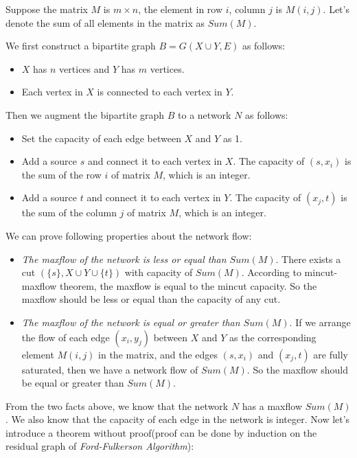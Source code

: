 
Suppose the matrix $M$ is $m \times n$, the element in row $i$, column $j$ is $M(i, j)$. Let's denote the sum of all elements in the matrix as $Sum(M)$.

We first construct a bipartite graph $B = G(X \cup Y, E)$ as follows:

\begin{itemize}
  \item $X$ has $n$ vertices and $Y$ has $m$ vertices.
  \item Each vertex in $X$ is connected to each vertex in $Y$.
\end{itemize}

Then we augment the bipartite graph $B$ to a network $N$ as follows:

\begin{itemize}
  \item Set the capacity of each edge between $X$ and $Y$ as 1.
  \item Add a source $s$ and connect it to each vertex in $X$. The capacity of $(s, x_i)$ is the sum of the row $i$ of matrix $M$, which is an integer.
  \item Add a source $t$ and connect it to each vertex in $Y$. The capacity of $(x_j, t)$ is the sum of the column $j$ of matrix $M$, which is an integer.
\end{itemize}

We can prove following properties about the network flow:

\begin{itemize}
  \item \textit{The maxflow of the network is less or equal than $Sum(M)$}. There exists a cut $(\{s\}, X \cup Y \cup \{t\})$ with capacity of $Sum(M)$. According to mincut-maxflow theorem, the maxflow is equal to the mincut capacity. So the maxflow should be less or equal than the capacity of any cut.
  \item \textit{The maxflow of the network is equal or greater than $Sum(M)$}. If we arrange the flow of each edge $(x_i, y_j)$ between $X$ and $Y$ as the corresponding element $M(i, j)$ in the matrix, and the edges $(s, x_i)$ and $(x_j, t)$ are fully saturated, then we have a network flow of $Sum(M)$. So the maxflow should be equal or greater than $Sum(M)$.
\end{itemize}

From the two facts above, we know that the network $N$ has a maxflow $Sum(M)$. We also know that the capacity of each edge in the network is integer. Now let's introduce a theorem without proof(proof can be done by induction on the residual graph of \textit{Ford-Fulkerson Algorithm}):

